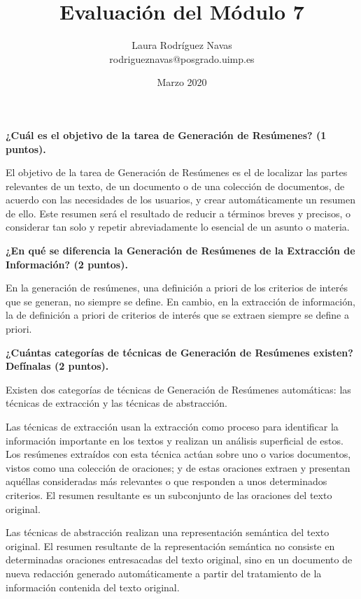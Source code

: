 \documentclass[11pt]{exam}
\title{Evaluación del Módulo 7}
\author{Laura Rodríguez Navas \\ rodrigueznavas@posgrado.uimp.es}
\date{Marzo 2020}
\begin{document}
	
\maketitle

\begin{questions}
	
{\bf \question ¿Cuál es el objetivo de la tarea de Generación de Resúmenes? (1 puntos).}

El objetivo de la tarea de Generación de Resúmenes es el de localizar las partes relevantes de un texto, de un documento o de una colección de documentos, de acuerdo con las necesidades de los usuarios, y crear automáticamente un resumen de ello. Este resumen será el resultado de reducir a términos breves y precisos, o considerar tan solo y repetir abreviadamente lo esencial de un asunto o materia.

{\bf \question ¿En qué se diferencia la Generación de Resúmenes de la Extracción de Información? (2 puntos).}

En la generación de resúmenes, una definición a priori de los criterios de interés que se generan, no siempre se define. En cambio, en la extracción de información, la de definición a priori de criterios de interés que se extraen siempre se define a priori.

{\bf \question ¿Cuántas categorías de técnicas de Generación de Resúmenes existen? Defínalas (2 puntos).}

Existen dos categorías de técnicas de Generación de Resúmenes automáticas: las técnicas de extracción y las técnicas de abstracción.

Las técnicas de extracción usan la extracción como proceso para identificar la información importante en los textos y realizan un análisis superficial de estos. Los resúmenes extraídos con esta técnica actúan sobre uno o varios documentos, vistos como una colección de oraciones; y de estas oraciones extraen y presentan aquéllas consideradas más relevantes o que responden a unos determinados criterios. El resumen resultante es un subconjunto de las oraciones del texto original.

Las técnicas de abstracción realizan una representación semántica del texto original. El resumen resultante de la representación semántica no consiste en determinadas oraciones entresacadas del texto original, sino en un documento de nueva redacción generado automáticamente a partir del tratamiento de la información contenida del texto original.


\end{questions}
\end{document}
